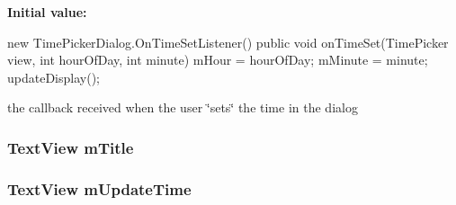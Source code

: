 {\bfseries Initial value\-:}
\begin{DoxyCode}

                        new TimePickerDialog.OnTimeSetListener() {
                public void onTimeSet(TimePicker view, int hourOfDay, int 
      minute) {
                        mHour = hourOfDay;
                        mMinute = minute;
                        updateDisplay();
                }
        }
\end{DoxyCode}
the callback received when the user \char`\"{}sets\char`\"{} the time in the dialog \hypertarget{classcom_1_1example_1_1android_1_1_bluetooth_chat_1_1_l_a_s_a_r_control_aa22ebf7a5e5b4c7bf8cb4f2021889076}{
\subsubsection[{m\-Title}]{\setlength{\rightskip}{0pt plus 5cm}Text\-View {\bf m\-Title}}}\label{classcom_1_1example_1_1android_1_1_bluetooth_chat_1_1_l_a_s_a_r_control_aa22ebf7a5e5b4c7bf8cb4f2021889076}
\hypertarget{classcom_1_1example_1_1android_1_1_bluetooth_chat_1_1_l_a_s_a_r_control_a15a773313ee00f93b799d57392f2bad3}{
\subsubsection[{m\-Update\-Time}]{\setlength{\rightskip}{0pt plus 5cm}Text\-View {\bf m\-Update\-Time}}}\label{classcom_1_1example_1_1android_1_1_bluetooth_chat_1_1_l_a_s_a_r_control_a15a773313ee00f93b799d57392f2bad3}
